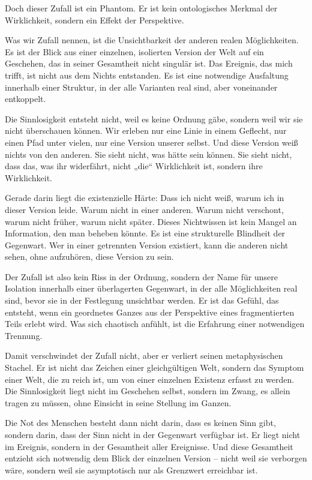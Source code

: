 \documentclass[
  ngerman,
]{article}
\begin{document}
Doch dieser Zufall ist ein Phantom. Er ist kein ontologisches Merkmal
der Wirklichkeit, sondern ein Effekt der Perspektive.

Was wir Zufall nennen, ist die Unsichtbarkeit der anderen realen
Möglichkeiten. Es ist der Blick aus einer einzelnen, isolierten Version
der Welt auf ein Geschehen, das in seiner Gesamtheit nicht singulär ist.
Das Ereignis, das mich trifft, ist nicht aus dem Nichts entstanden. Es
ist eine notwendige Ausfaltung innerhalb einer Struktur, in der alle
Varianten real sind, aber voneinander entkoppelt.

Die Sinnlosigkeit entsteht nicht, weil es keine Ordnung gäbe, sondern
weil wir sie nicht überschauen können. Wir erleben nur eine Linie in
einem Geflecht, nur einen Pfad unter vielen, nur eine Version unserer
selbst. Und diese Version weiß nichts von den anderen. Sie sieht nicht,
was hätte sein können. Sie sieht nicht, dass das, was ihr widerfährt,
nicht „die`` Wirklichkeit ist, sondern ihre Wirklichkeit.

Gerade darin liegt die existenzielle Härte: Dass ich nicht weiß, warum
ich in dieser Version leide. Warum nicht in einer anderen. Warum nicht
verschont, warum nicht früher, warum nicht später. Dieses Nichtwissen
ist kein Mangel an Information, den man beheben könnte. Es ist eine
strukturelle Blindheit der Gegenwart. Wer in einer getrennten Version
existiert, kann die anderen nicht sehen, ohne aufzuhören, diese Version
zu sein.

Der Zufall ist also kein Riss in der Ordnung, sondern der Name für
unsere Isolation innerhalb einer überlagerten Gegenwart, in der alle
Möglichkeiten real sind, bevor sie in der Festlegung unsichtbar werden.
Er ist das Gefühl, das entsteht, wenn ein geordnetes Ganzes aus der
Perspektive eines fragmentierten Teils erlebt wird. Was sich chaotisch
anfühlt, ist die Erfahrung einer notwendigen Trennung.

Damit verschwindet der Zufall nicht, aber er verliert seinen
metaphysischen Stachel. Er ist nicht das Zeichen einer gleichgültigen
Welt, sondern das Symptom einer Welt, die zu reich ist, um von einer
einzelnen Existenz erfasst zu werden. Die Sinnlosigkeit liegt nicht im
Geschehen selbst, sondern im Zwang, es allein tragen zu müssen, ohne
Einsicht in seine Stellung im Ganzen.

Die Not des Menschen besteht dann nicht darin, dass es keinen Sinn gibt,
sondern darin, dass der Sinn nicht in der Gegenwart verfügbar ist. Er
liegt nicht im Ereignis, sondern in der Gesamtheit aller Ereignisse. Und
diese Gesamtheit entzieht sich notwendig dem Blick der einzelnen Version
-- nicht weil sie verborgen wäre, sondern weil sie asymptotisch nur als
Grenzwert erreichbar ist.
\end{document}
